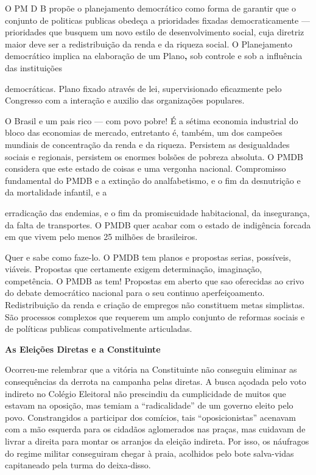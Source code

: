 O PM D B propõe o planejamento democrático como forma de garantir que o
conjunto de politicas publicas obedeça a prioridades fixadas
democraticamente --- prioridades que busquem um novo estilo de
desenvolvimento social, cuja diretriz maior deve ser a redistribuição da
renda e da riqueza social. O Planejamento democrático implica na
elaboração de um Plano\textbf{,} sob controle e sob a influência das
instituições

democráticas. Plano fixado através de lei, supervisionado eficazmente
pelo Congresso com a interação e auxilio das organizações populares.

O Brasil e um pais rico --- com povo pobre! É a sétima economia
industrial do bloco das economias de mercado, entretanto é, também, um
dos campeões mundiais de concentração da renda e da riqueza. Persistem
as desigualdades sociais e regionais, persistem os enormes bolsões de
pobreza absoluta. O PMDB considera que este estado de coisas e uma
vergonha nacional. Compromisso fundamental do PMDB e a extinção do
analfabetismo, e o fim da desnutrição e da mortalidade infantil, e a

erradicação das endemias, e o fim da promiscuidade habitacional, da
insegurança, da falta de transportes. O PMDB quer acabar com o estado de
indigência forcada em que vivem pelo menos 25 milhões de brasileiros.

Quer e sabe como faze-lo. O PMDB tem planos e propostas serias,
possíveis, viáveis. Propostas que certamente exigem determinação,
imaginação, competência. O PMDB as tem! Propostas em aberto que sao
oferecidas ao crivo do debate democrático nacional para o seu continuo
aperfeiçoamento. Redistribuição da renda e criação de empregos não
constituem metas simplistas. São processos complexos que requerem um
amplo conjunto de reformas sociais e de políticas publicas
compativelmente articuladas.

\textbf{As Eleições Diretas e a Constituinte}

Ocorreu-me relembrar que a vitória na Constituinte não conseguiu
eliminar as consequências da derrota na campanha pelas diretas. A busca
açodada pelo voto indireto no Colégio Eleitoral não prescindiu da
cumplicidade de muitos que estavam na oposição, mas temiam a
``radicalidade'' de um governo eleito pelo povo. Constrangidos a
participar dos comícios, tais ``oposicionistas'' acenavam com a mão
esquerda para os cidadãos aglomerados nas praças, mas cuidavam de livrar
a direita para montar os arranjos da eleição indireta. Por isso, os
náufragos do regime militar conseguiram chegar à praia, acolhidos pelo
bote salva-vidas capitaneado pela turma do deixa-disso.

